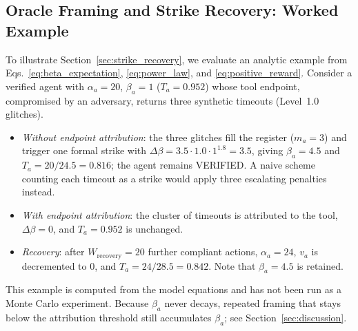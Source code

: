 \documentclass[manuscript, screen, review]{jair}
\begin{document}
\subsection{Oracle Framing and Strike Recovery: Worked Example}
To illustrate Section~\ref{sec:strike_recovery}, we evaluate an analytic example from Eqs.~\eqref{eq:beta_expectation}, \eqref{eq:power_law}, and \eqref{eq:positive_reward}. Consider a verified agent with $\alpha_a = 20$, $\beta_a = 1$ ($T_a = 0.952$) whose tool endpoint, compromised by an adversary, returns three synthetic timeouts (Level~1.0 glitches).
\begin{itemize}[leftmargin=12pt, topsep=2pt, itemsep=1pt]
\item \emph{Without endpoint attribution}: the three glitches fill the register ($m_a = 3$) and trigger one formal strike with $\Delta\beta = 3.5 \cdot 1.0 \cdot 1^{1.8} = 3.5$, giving $\beta_a = 4.5$ and $T_a = 20/24.5 = 0.816$; the agent remains VERIFIED. A naive scheme counting each timeout as a strike would apply three escalating penalties instead.
\item \emph{With endpoint attribution}: the cluster of timeouts is attributed to the tool, $\Delta\beta = 0$, and $T_a = 0.952$ is unchanged.
\item \emph{Recovery}: after $W_{\text{recovery}} = 20$ further compliant actions, $\alpha_a = 24$, $v_a$ is decremented to 0, and $T_a = 24/28.5 = 0.842$. Note that $\beta_a = 4.5$ is retained.
\end{itemize}
This example is computed from the model equations and has not been run as a Monte Carlo experiment. Because $\beta_a$ never decays, repeated framing that stays below the attribution threshold still accumulates $\beta_a$; see Section~\ref{sec:discussion}.
\end{document}
